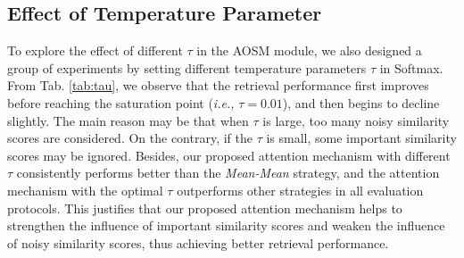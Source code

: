 \documentclass[sigconf]{acmart}
\begin{document}
\subsection{Effect of Temperature Parameter}
\begin{table}[]
\vspace{-0.2cm}
\caption{Retrieval performance with different temprature parameters $\tau$ in Softmax on the MSR-VTT dataset.}
\vspace{-0.3cm}
\vspace{-0.4cm}
\label{tab:tau}
\end{table}





To explore the effect of different $\tau$ in the AOSM module, we also designed a group of experiments by setting different temperature parameters $\tau$ in Softmax. From Tab. \ref{tab:tau}, we observe that the retrieval performance first improves before reaching the saturation point (\emph{i.e.,} $\tau = 0.01$), and then begins to decline slightly. The main reason may be that when $\tau$ is large, too many noisy similarity scores are considered. On the contrary, if the $\tau$ is small, some important similarity scores may be ignored. Besides, our proposed attention mechanism with different $\tau$ consistently performs better than the \emph{Mean-Mean} strategy, and the attention mechanism with the optimal $\tau$ outperforms other strategies in all evaluation protocols. This justifies that our proposed attention mechanism helps to strengthen the influence of important similarity scores and weaken the influence of noisy similarity scores, thus achieving better retrieval performance.
\end{document}
